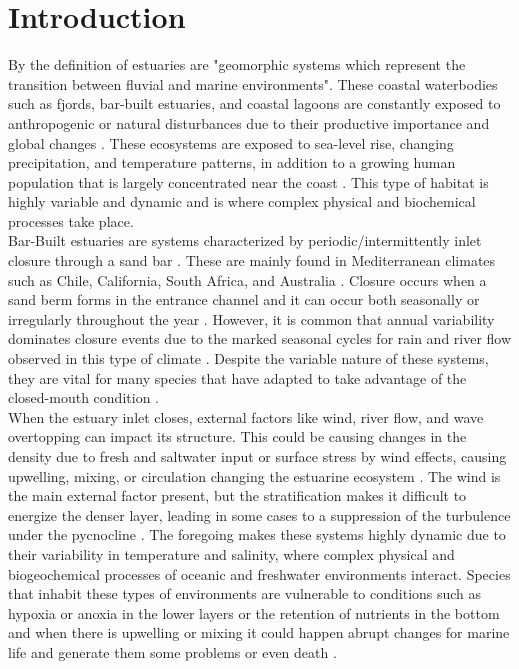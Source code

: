 \documentclass[tesis.tex]{subfiles}
\begin{document}
\section{Introduction}
By the definition of \cite{mcsweeney2017intermittently} estuaries are "geomorphic systems which represent the transition between fluvial and marine environments". These coastal waterbodies such as fjords, bar-built estuaries, and coastal lagoons are constantly exposed to anthropogenic or natural disturbances due to their productive importance \citep{schernewski2002baltic, martinez2007coasts} and global changes \citep{grez2020evidence}. These ecosystems are exposed to sea-level rise, changing precipitation, and temperature patterns, in addition to a growing human population that is largely concentrated near the coast \citep{neumann2015future}. This type of habitat is highly variable and dynamic and is where complex physical and biochemical processes take place.\\
    
Bar-Built estuaries are systems characterized by periodic/intermittently inlet closure through a sand bar \citep{whitfield2007review}. These are mainly found in Mediterranean climates such as Chile, California, South Africa, and Australia \citep{mcsweeney2017intermittently}. Closure occurs when a sand berm forms in the entrance channel and it can occur both seasonally or irregularly throughout the year \citep{Behrens2013}. However, it is common that annual variability dominates closure events due to the marked seasonal cycles for rain and river flow observed in this type of climate \citep{Ranasinghe2003}. Despite the variable nature of these systems, they are vital for many species that have adapted to take advantage of the closed-mouth condition \citep{viaroli2008community}.\\

When the estuary inlet closes, external factors like wind, river flow, and wave overtopping can impact its structure. This could be causing changes in the density due to fresh and saltwater input or surface stress by wind effects, causing upwelling, mixing, or circulation changing the estuarine ecosystem \citep{Ranasinghe1999}.  The wind is the main external factor present, but the stratification makes it difficult to energize the denser layer, leading in some cases to a suppression of the turbulence under the pycnocline \citep{Cousins2010}. The foregoing makes these systems highly dynamic due to their variability in temperature and salinity, where complex physical and biogeochemical processes of oceanic and freshwater environments interact. Species that inhabit these types of environments are vulnerable to conditions such as hypoxia or anoxia in the lower layers \citep{Kelly2018} or the retention of nutrients in the bottom \citep{Cousins2010} and when there is upwelling or mixing it could happen abrupt changes for marine life and generate them some problems or even death \citep{marti2008relating}.\\
\end{document}
